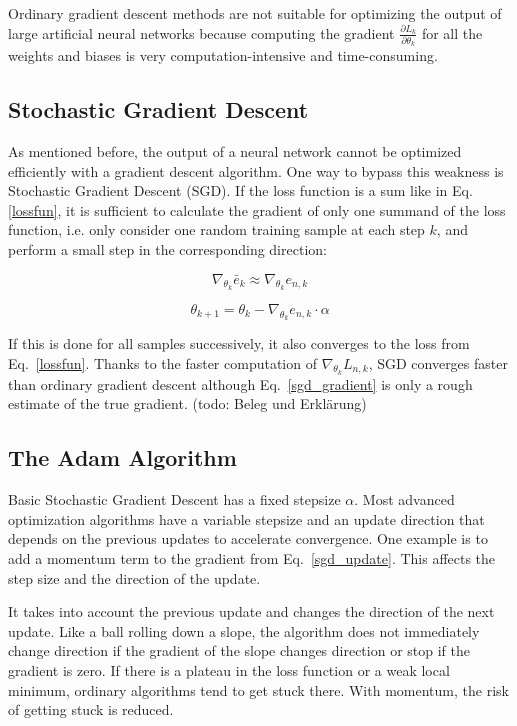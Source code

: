 Ordinary gradient descent methods are not suitable for optimizing the output of large artificial neural networks because computing the gradient $\frac{\partial L_k}{\partial \theta_k}$ for all the weights and biases is very computation-intensive and time-consuming.

\subsection{Stochastic Gradient Descent}
\label{sec:sgd}

As mentioned before, the output of a neural network cannot be optimized efficiently with a gradient descent algorithm. One way to bypass this weakness is Stochastic Gradient Descent (SGD). If the loss function is a sum like in Eq. \ref{lossfun}, it is sufficient to calculate the gradient of only one summand of the loss function, i.e. only consider one random training sample at each step $k$, and perform a small step in the corresponding direction:

\begin{equation}
\nabla_{\theta_k}\bar{e}_k \approx \nabla_{\theta_k}e_{n,k}
\label{sgd_gradient}
\end{equation}

\begin{equation}
\theta_{k+1} = \theta_k - \nabla_{\theta_k}e_{n,k} \cdot \alpha
\label{sgd_update}
\end{equation}

If this is done for all samples successively, it also converges to the loss from Eq.~\ref{lossfun}. 
Thanks to the faster computation of $\nabla_{\theta_k}L_{n,k}$, SGD converges faster than ordinary gradient descent although Eq.~\ref{sgd_gradient} is only a rough estimate of the true gradient. (todo: Beleg und Erklärung)


\subsection{The Adam Algorithm}
\label{sec:adam}

Basic Stochastic Gradient Descent has a fixed stepsize $\alpha$. Most advanced optimization algorithms have a variable stepsize and an update direction that depends on the previous updates to accelerate convergence. One example is to add a momentum term to the gradient from Eq.~\ref{sgd_update}. This affects the step size and the direction of the update.

It takes into account the previous update and changes the direction of the next update. Like a ball rolling down a slope, the algorithm does not immediately change direction if the gradient of the slope changes direction or stop if the gradient is zero. If there is a plateau in the loss function or a weak local minimum, ordinary algorithms tend to get stuck there. With momentum, the risk of getting stuck is reduced.


